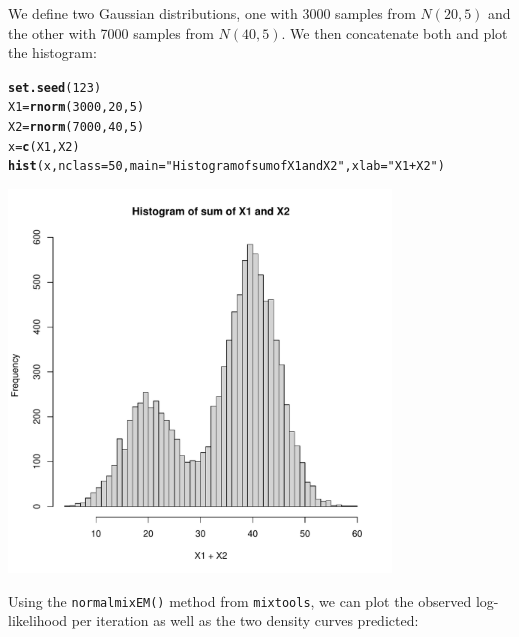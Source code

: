 \documentclass{article}\usepackage[]{graphicx}\usepackage[]{xcolor}
\makeatletter
\newcommand{\hlnum}[1]{\textcolor[rgb]{0.686,0.059,0.569}{#1}}%
\newcommand{\hlstr}[1]{\textcolor[rgb]{0.192,0.494,0.8}{#1}}%
\newcommand{\hlstd}[1]{\textcolor[rgb]{0.345,0.345,0.345}{#1}}%
\newcommand{\hlkwb}[1]{\textcolor[rgb]{0.69,0.353,0.396}{#1}}%
\newcommand{\hlkwc}[1]{\textcolor[rgb]{0.333,0.667,0.333}{#1}}%
\newcommand{\hlkwd}[1]{\textcolor[rgb]{0.737,0.353,0.396}{\textbf{#1}}}%
\newenvironment{kframe}{%
 \def\at@end@of@kframe{}%
 \ifinner\ifhmode%
  \def\at@end@of@kframe{\end{minipage}}%
  \begin{minipage}{\columnwidth}%
 \fi\fi%
 \def\FrameCommand##1{\hskip\@totalleftmargin \hskip-\fboxsep
 \colorbox{shadecolor}{##1}\hskip-\fboxsep
     \hskip-\linewidth \hskip-\@totalleftmargin \hskip\columnwidth}%
 \MakeFramed {\advance\hsize-\width
   \@totalleftmargin\z@ \linewidth\hsize
   \@setminipage}}%
 {\par\unskip\endMakeFramed%
 \at@end@of@kframe}
\newenvironment{knitrout}{}{} %
\theoremstyle{plain}
\theoremstyle{definition}
\theoremstyle{remark}
\makeatother
\begin{document}
\singlespacing
We define two Gaussian distributions, one with 3000 samples from $N(20, 5)$ and the other with 7000 samples from $N(40, 5)$. We then concatenate both and plot the histogram:
\begin{knitrout}
\color{fgcolor}\begin{kframe}
\begin{alltt}
  \hlkwd{set.seed}\hlstd{(}\hlnum{123}\hlstd{)}
  \hlstd{X1} \hlkwb{=} \hlkwd{rnorm}\hlstd{(}\hlnum{3000}\hlstd{,} \hlnum{20}\hlstd{,} \hlnum{5}\hlstd{)}
  \hlstd{X2} \hlkwb{=} \hlkwd{rnorm}\hlstd{(}\hlnum{7000}\hlstd{,} \hlnum{40}\hlstd{,} \hlnum{5}\hlstd{)}
  \hlstd{x} \hlkwb{=} \hlkwd{c}\hlstd{(X1, X2)}
  \hlkwd{hist}\hlstd{(x,} \hlkwc{nclass}\hlstd{=}\hlnum{50}\hlstd{,} \hlkwc{main}\hlstd{=}\hlstr{"Histogram of sum of X1 and X2"}\hlstd{,} \hlkwc{xlab}\hlstd{=}\hlstr{"X1 + X2"}\hlstd{)}
\end{alltt}
\end{kframe}

{\centering \includegraphics[width=4in]{figure/unnamed-chunk-3-1} 

}


\end{knitrout}
Using the \texttt{normalmixEM()} method from \texttt{mixtools}, we can plot the observed log-likelihood per iteration as well as the two density curves predicted:
\end{document}
